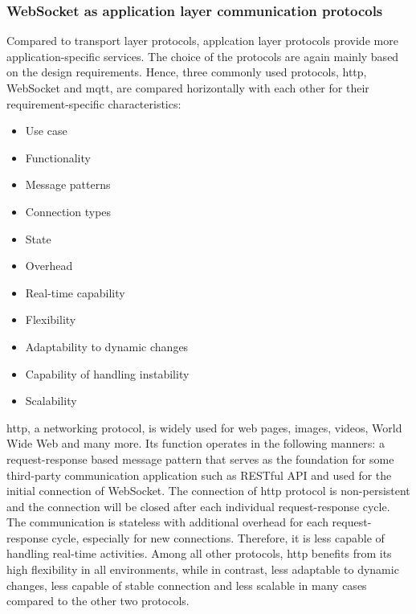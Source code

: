 \subsubsection{WebSocket as application layer communication protocols}
Compared to transport layer protocols, applcation layer protocols provide more 
application-specific services. The choice of the protocols are again mainly based on the 
design requirements. Hence, three commonly used protocols, \gls{http}, 
WebSocket and \gls{mqtt}, are compared horizontally with each other for their 
requirement-specific characteristics:

\begin{itemize}
    \item Use case
    \item Functionality
    \item Message patterns 
    \item Connection types
    \item State
    \item Overhead
    \item Real-time capability
    \item Flexibility
    \item Adaptability to dynamic changes
    \item Capability of handling instability
    \item Scalability
\end{itemize}

\gls{http}, a networking protocol, is widely used for web pages, images, videos, World 
Wide Web and many more. Its function operates in the following manners: a 
request-response based message pattern that serves as the foundation for some third-party 
communication application such as RESTful API and used for the initial connection of WebSocket. The connection 
of \gls{http} protocol is non-persistent and the connection will be closed after 
each individual request-response cycle. The communication is stateless with additional 
overhead for each request-response cycle, especially for new connections. Therefore, 
it is less capable of handling real-time activities. Among all other protocols, 
\gls{http} benefits from its high flexibility in all environments, while in contrast, less 
adaptable to dynamic changes, less capable of stable connection and less scalable 
in many cases compared to the other two protocols. 


